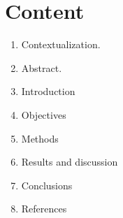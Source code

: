 \section*{Content}
\begin{enumerate}
    \item[] Contextualization.
    \item[] Abstract.
    \item Introduction 
    \item Objectives 
    \item Methods 
    \item Results and discussion 
    \item Conclusions 
    \item[] References
\end{enumerate}